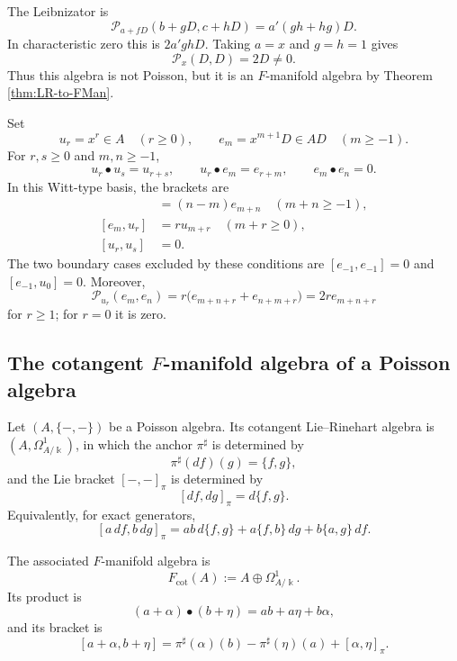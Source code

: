 \documentclass[12pt,reqno]{amsart}
\theoremstyle{definition}
\theoremstyle{remark}
\newcommand{\kk}{\Bbbk}
\newcommand{\Pcal}{\mathcal P}
\newcommand{\Fcot}{F_{\mathrm{cot}}}
\begin{document}
	The Leibnizator is
	\begin{equation}\label{eq:poly-Leibnizator}
		\Pcal_{a+fD}(b+gD,c+hD)=a'(gh+hg)D.
	\end{equation}
	In characteristic zero this is $2a'ghD$.  Taking $a=x$ and $g=h=1$ gives
	\[
	\Pcal_x(D,D)=2D\neq0.
	\]
	Thus this algebra is not Poisson, but it is an $F$-manifold algebra by
	Theorem \ref{thm:LR-to-FMan}.
	
	Set
	\[
	u_r=x^r\in A\quad(r\geq0),
	\qquad
	e_m=x^{m+1}D\in A D\quad(m\geq-1).
	\]
	For $r,s\geq0$ and $m,n\geq-1$,
	\[
	u_r\bullet u_s=u_{r+s},
	\qquad
	u_r\bullet e_m=e_{r+m},
	\qquad
	e_m\bullet e_n=0.
	\]
	In this Witt-type basis, the brackets are
	\begin{align*}
		[e_m,e_n]&=(n-m)e_{m+n}\quad(m+n\geq-1),\\
		[e_m,u_r]&=r u_{m+r}\quad(m+r\geq0),\\
		[u_r,u_s]&=0.
	\end{align*}
	The two boundary cases excluded by these conditions are
	\([e_{-1},e_{-1}]=0\) and
	\([e_{-1},u_0]=0\).
	Moreover,
	\[
	\Pcal_{u_r}(e_m,e_n)
	=r\bigl(e_{m+n+r}+e_{n+m+r}\bigr)
	=2r e_{m+n+r}
	\]
	for \(r\geq1\); for \(r=0\) it is zero.
	
	\subsection{The cotangent \texorpdfstring{$F$}{F}-manifold algebra of a Poisson algebra}
	
	Let $(A,\{-,-\})$ be a Poisson algebra.  Its cotangent Lie--Rinehart algebra
	is $(A,\Omega^1_{A/\kk})$, in which the anchor $\pi^\sharp$ is determined by
	\begin{equation}\label{eq:cot-anchor}
		\pi^\sharp(df)(g)=\{f,g\},
	\end{equation}
	and the Lie bracket $[-,-]_\pi$ is determined by
	\begin{equation}\label{eq:cot-exact}
		[df,dg]_{\pi}=d\{f,g\}.
	\end{equation}
	  Equivalently, for exact generators,
	\begin{equation}\label{eq:cot-bracket-adf}
		[a\,df,b\,dg]_{\pi}
		=ab\,d\{f,g\}+a\{f,b\}\,dg+b\{a,g\}\,df.
	\end{equation}
	
	
	The associated $F$-manifold algebra is
	\[
	\Fcot(A):=A\oplus\Omega^1_{A/\kk}.
	\]
	Its product is
	\begin{equation}\label{eq:cot-F-product}
		(a+\alpha)\bullet(b+\eta)=ab+a\eta+b\alpha,
	\end{equation}
	and its bracket is
	\begin{equation}\label{eq:cot-F-bracket}
		[a+\alpha,b+\eta]
		=\pi^\sharp(\alpha)(b)-\pi^\sharp(\eta)(a)+[\alpha,\eta]_{\pi}.
	\end{equation}
	
\end{document}
